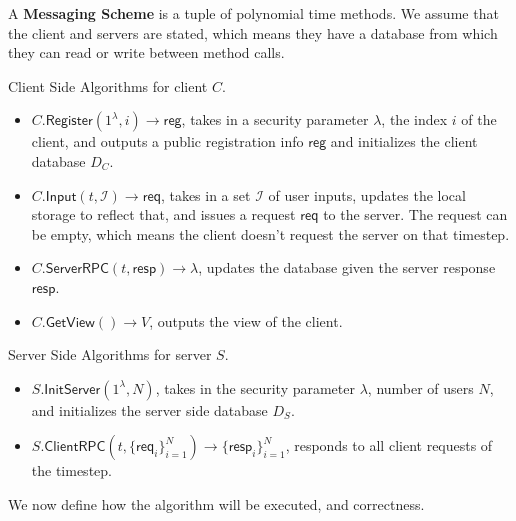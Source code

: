 \documentclass[sigconf, nonacm, balance=false, natbib=false, screen]{acmart}
\newcommand{\reg}{\mathsf{reg}}
\newcommand{\req}{\mathsf{req}}
\newcommand{\resp}{\mathsf{resp}}
\newcommand{\cI}{\mathcal{I}}
\begin{document}
\begin{definition}
A \textbf{Messaging Scheme} is a tuple of polynomial time methods. We assume that the client and servers are stated, which means they have a database from which they can read or write between method calls.

Client Side Algorithms for client $C$.
\begin{itemize}
    \item $C.\mathsf{Register}(1^{\lambda}, i) \to \reg$, takes in a security parameter $\lambda$, the index $i$ of the client, and outputs a public registration info $\reg$ and initializes the client database $D_C$.
    
    \item $C.\mathsf{Input}(t, \cI) \to \req$, takes in a set $\cI$ of user inputs, updates the local storage to reflect that, and issues a request $\req$ to the server. The request can be empty, which means the client doesn't request the server on that timestep.
    
    \item $C.\mathsf{ServerRPC}(t, \resp)\to \lambda$, updates the database given the server response $\resp$.
    
    \item $C.\mathsf{GetView}() \to V$, outputs the view of the client.
\end{itemize}

Server Side Algorithms for server $S$.

\begin{itemize}
    \item $S.\mathsf{InitServer}(1^{\lambda}, N)$, takes in the security parameter $\lambda$, number of users $N$, and initializes the server side database $D_S$.
    \item $S.\mathsf{ClientRPC}(t, \{\req_i\}_{i = 1}^N) \to \{\resp_i\}_{i = 1}^N$, responds to all client requests of the timestep.
\end{itemize}
\end{definition}
We now define how the algorithm will be executed, and correctness.
\vspace{40mm}
\end{document}
